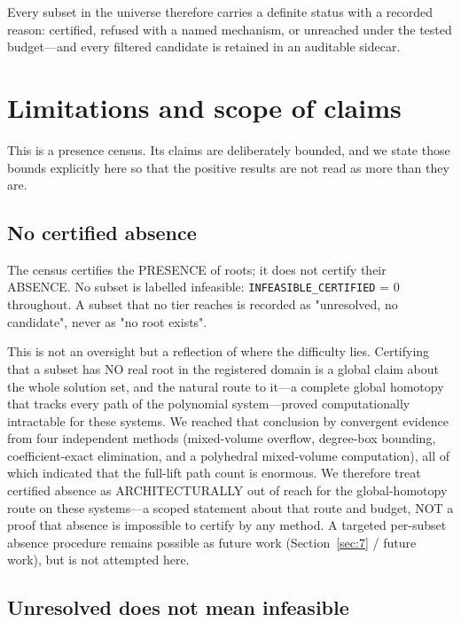 \documentclass[pdflatex,sn-mathphys-num]{sn-jnl}
\begin{document}
Every subset in the universe therefore carries a definite status with a recorded reason: certified, refused with a named mechanism, or unreached under the tested budget---and every filtered candidate is retained in an auditable sidecar.

\section{Limitations and scope of claims}\label{sec:8}

This is a presence census. Its claims are deliberately bounded, and we state those bounds explicitly here so that the positive results are not read as more than they are.

\subsection{No certified absence}\label{sec:8.1}

The census certifies the PRESENCE of roots; it does not certify their ABSENCE. No subset is labelled infeasible: \texttt{INFEASIBLE\_CERTIFIED} = 0 throughout. A subset that no tier reaches is recorded as "unresolved, no candidate", never as "no root exists".

This is not an oversight but a reflection of where the difficulty lies. Certifying that a subset has NO real root in the registered domain is a global claim about the whole solution set, and the natural route to it---a complete global homotopy that tracks every path of the polynomial system---proved
computationally intractable for these systems. We reached that conclusion by convergent evidence from four independent methods (mixed-volume overflow, degree-box bounding, coefficient-exact elimination, and a polyhedral mixed-volume computation), all of which indicated that the full-lift path count is enormous. We therefore treat certified absence as ARCHITECTURALLY out of reach for the global-homotopy route on these systems---a scoped statement about that route and budget, NOT a proof that absence is impossible to certify by any method. A targeted per-subset absence procedure remains possible as
future work (Section~\ref{sec:7} / future work), but is not attempted here.

\subsection{Unresolved does not mean infeasible}\label{sec:8.2}
\end{document}
